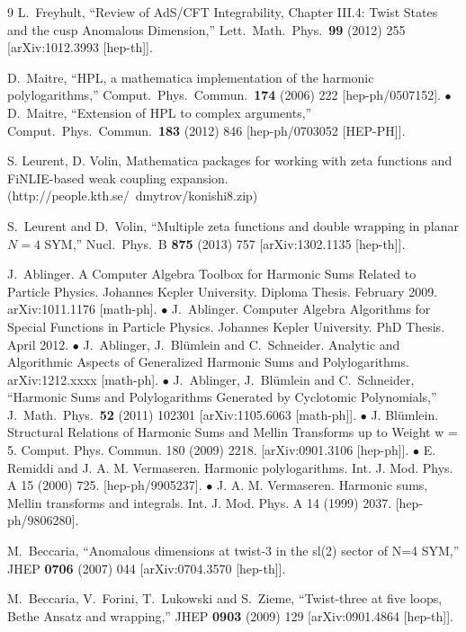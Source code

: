 \documentclass[a4paper,11pt]{article}
\numberwithin{equation}{section}
\begin{document}
\begin{thebibliography} {9}
  L.~Freyhult,
  ``Review of AdS/CFT Integrability, Chapter III.4: Twist States and the cusp Anomalous Dimension,''
  Lett.\ Math.\ Phys.\  {\bf 99} (2012) 255
  [arXiv:1012.3993 [hep-th]].

D.~Maitre,
  ``HPL, a mathematica implementation of the harmonic polylogarithms,''
  Comput.\ Phys.\ Commun.\  {\bf 174} (2006) 222
  [hep-ph/0507152]. $\bullet$
  D.~Maitre,
  ``Extension of HPL to complex arguments,''
  Comput.\ Phys.\ Commun.\  {\bf 183} (2012) 846
  [hep-ph/0703052 [HEP-PH]].

S. Leurent, D. Volin, Mathematica packages for working with zeta
functions and FiNLIE-based weak coupling expansion.
(http://people.kth.se/~dmytrov/konishi8.zip)

  S.~Leurent and D.~Volin,
  ``Multiple zeta functions and double wrapping in planar $N=4$ SYM,''
  Nucl.\ Phys.\ B {\bf 875} (2013) 757
  [arXiv:1302.1135 [hep-th]].

  J.~Ablinger.
  A Computer Algebra Toolbox for Harmonic Sums Related to Particle Physics. Johannes Kepler University. Diploma Thesis. February 2009.
  arXiv:1011.1176 [math-ph].   $\bullet$
J.~Ablinger. Computer Algebra Algorithms for Special Functions in Particle Physics. Johannes Kepler University. PhD Thesis. April 2012. $\bullet$
J.~Ablinger, J.~Bl\"umlein and C.~Schneider. Analytic and Algorithmic Aspects of Generalized Harmonic Sums and Polylogarithms. arXiv:1212.xxxx [math-ph].
$\bullet$
  J.~Ablinger, J.~Bl\"umlein and C.~Schneider,
  ``Harmonic Sums and Polylogarithms Generated by Cyclotomic Polynomials,''
  J.\ Math.\ Phys.\  {\bf 52} (2011) 102301
[arXiv:1105.6063 [math-ph]].
$\bullet$
J. Bl\"umlein. Structural Relations of Harmonic Sums and Mellin Transforms up to Weight w = 5. Comput. Phys. Commun. 180 (2009) 2218. [arXiv:0901.3106 [hep-ph]].
$\bullet$
E. Remiddi and J. A. M. Vermaseren. Harmonic polylogarithms. Int. J. Mod. Phys. A 15 (2000) 725. [hep-ph/9905237].
$\bullet$
J. A. M. Vermaseren. Harmonic sums, Mellin transforms and integrals. Int. J. Mod. Phys. A 14 (1999) 2037. [hep-ph/9806280].

  M.~Beccaria,
  ``Anomalous dimensions at twist-3 in the sl(2) sector of N=4 SYM,''
  JHEP {\bf 0706} (2007) 044
  [arXiv:0704.3570 [hep-th]].

  M.~Beccaria, V.~Forini, T.~Lukowski and S.~Zieme,
  ``Twist-three at five loops, Bethe Ansatz and wrapping,''
  JHEP {\bf 0903} (2009) 129
  [arXiv:0901.4864 [hep-th]].


\end{thebibliography}
\end{document}
